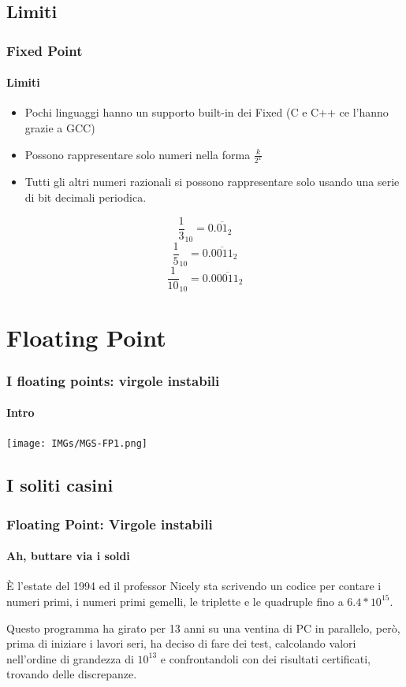 \documentclass{beamer}
\begin{document}
  \subsection{Limiti}
	\begin{frame}
    \frametitle{Fixed Point}
    \framesubtitle{Limiti}
    \begin{itemize}
			\item Pochi linguaggi hanno un supporto built-in dei Fixed (C e C++ ce l'hanno grazie a GCC)
    		\item Possono rappresentare solo numeri nella forma $\frac{k}{2^x}$
    		\item Tutti gli altri numeri razionali si possono rappresentare
    			solo usando una serie di bit decimali periodica.
    \end{itemize}
    \vspace{1em}
    $$\frac{1}{3}_{10} = 0.\overline{01}_{2}$$
    $$\frac{1}{5}_{10} = 0.\overline{0011}_{2}$$
    $$\frac{1}{10}_{10} = 0.0\overline{0011}_{2}$$
  \end{frame}
  \section{Floating Point}
 	\begin{frame}
 		\frametitle{I floating points: virgole instabili}
    \framesubtitle{Intro}
    \begin{center}
    		\texttt{[image: IMGs/MGS-FP1.png]}
    \end{center}
	\end{frame} 	 
  
  \subsection{I soliti casini}
	  \begin{frame}
	    \frametitle{Floating Point: Virgole instabili}
	    \framesubtitle{Ah, buttare via i soldi}
	    È l'estate del 1994 ed il professor Nicely sta scrivendo un codice per contare
	    i numeri primi, i numeri primi gemelli, le triplette e le quadruple fino a $6.4*10^{15}$.
	    
			\vspace{2em}	    
	    
	    Questo programma ha girato per 13 anni su una ventina di PC in parallelo, però, prima
	    di iniziare i lavori seri, ha deciso di fare dei test, calcolando valori nell'ordine
	    di grandezza di $10^{13}$ e confrontandoli con dei risultati certificati, trovando delle
	    discrepanze.
	    
	  \end{frame}
	  
\end{document}
